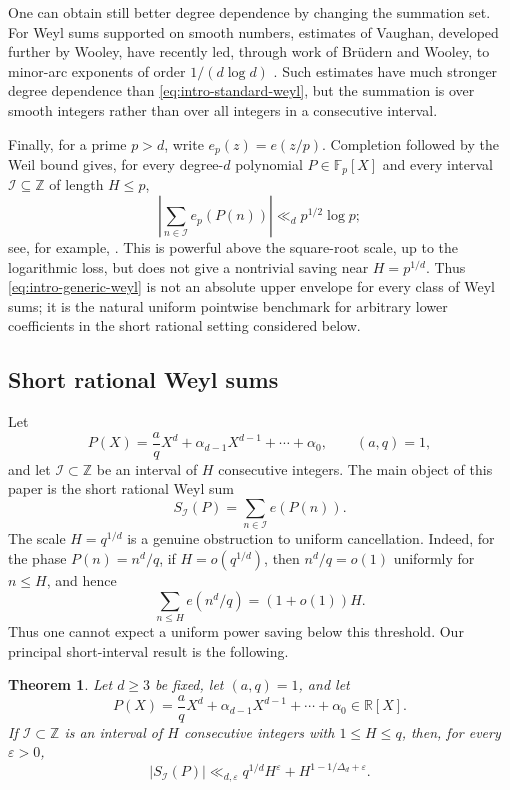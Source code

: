 \documentclass[11pt,reqno]{amsart}
\numberwithin{equation}{section}
\newtheorem{theorem}{Theorem}[section]
\theoremstyle{definition}
\theoremstyle{remark}
\begin{document}
One can obtain still better degree dependence by changing the summation set.
For Weyl sums supported on smooth numbers, estimates of Vaughan, developed
further by Wooley, have recently led, through work of Br\"udern and Wooley,
to minor-arc exponents of order $1/(d\log d)$
\cite{Vaughan1989,Wooley1995Smooth,BruedernWooley2025}.  Such estimates have
much stronger degree dependence than \eqref{eq:intro-standard-weyl}, but the
summation is over smooth integers rather than over all integers in a
consecutive interval.

Finally, for a prime $p>d$, write $e_p(z)=e(z/p)$.  Completion followed by
the Weil bound gives, for every degree-$d$ polynomial $P\in\mathbb F_p[X]$
and every interval $\mathcal I\subseteq\mathbb Z$ of length $H\le p$,
\begin{equation}\label{eq:intro-completion-weil}
  \left|\sum_{n\in\mathcal I}e_p(P(n))\right|
  \ll_d p^{1/2}\log p;
\end{equation}
see, for example, \cite{IwaniecKowalski2004}.  This is powerful above the
square-root scale, up to the logarithmic loss, but does not give a nontrivial
saving near $H=p^{1/d}$.  Thus \eqref{eq:intro-generic-weyl} is not an absolute upper
envelope for every class of Weyl sums; it is the natural uniform pointwise
benchmark for arbitrary lower coefficients in the short rational setting
considered below.

\subsection{Short rational Weyl sums}

Let
\[
  P(X)=\frac aqX^d+\alpha_{d-1}X^{d-1}+\cdots+\alpha_0,
  \qquad (a,q)=1,
\]
and let $\mathcal I\subset\mathbb Z$ be an interval of $H$ consecutive
integers.  The main object of this paper is the short rational Weyl sum
\begin{equation}\label{eq:intro-rational-sum}
  S_{\mathcal I}(P)=\sum_{n\in\mathcal I}e(P(n)).
\end{equation}
The scale $H=q^{1/d}$ is a genuine obstruction to uniform cancellation.
Indeed, for the phase $P(n)=n^d/q$, if $H=o(q^{1/d})$, then
$n^d/q=o(1)$ uniformly for $n\le H$, and hence
\[
  \sum_{n\le H}e(n^d/q)=(1+o(1))H.
\]
Thus one cannot expect a uniform power saving below this threshold.  Our
principal short-interval result is the following.

\begin{theorem}\label{thm:rational-short-intro}
Let $d\ge3$ be fixed, let $(a,q)=1$, and let
\[
  P(X)=\frac aqX^d+\alpha_{d-1}X^{d-1}+\cdots+\alpha_0
  \in\mathbb R[X].
\]
If $\mathcal I\subset\mathbb Z$ is an interval of $H$ consecutive integers
with $1\le H\le q$, then, for every $\varepsilon>0$,
\begin{equation}\label{eq:rational-short-intro}
  |S_{\mathcal I}(P)|
  \ll_{d,\varepsilon}
  q^{1/d}H^\varepsilon
  +H^{1-1/\Delta_d+\varepsilon}.
\end{equation}
\end{theorem}
\end{document}
